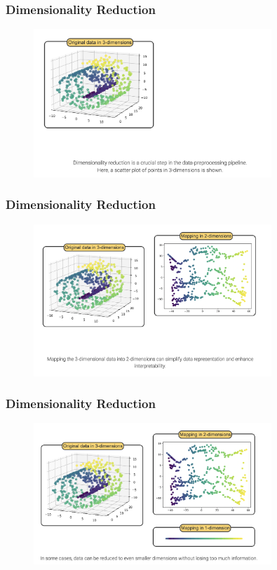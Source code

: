 \documentclass[8pt,dvipsnames]{beamer}
\begin{document}
\begin{frame}
    \frametitle{Dimensionality Reduction}
    \begin{figure}[ht]
        \centering
        \includegraphics[width=0.8\textwidth]{imgs/DR_1.png}
    \end{figure}
\end{frame}

\begin{frame}
    \frametitle{Dimensionality Reduction}
    \begin{figure}[ht]
        \centering
        \includegraphics[width=0.8\textwidth]{imgs/DR_2.png}
    \end{figure}
\end{frame}

\begin{frame}
    \frametitle{Dimensionality Reduction}
    \begin{figure}[ht]
        \centering
        \includegraphics[width=0.8\textwidth]{imgs/DR_3.png}
    \end{figure}
\end{frame}
\end{document}
